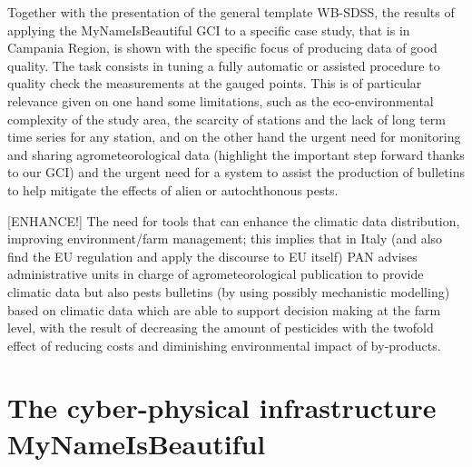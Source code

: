 \documentclass[authoryear,preprint,review,12pt]{elsarticle}
\begin{document}
Together with the presentation of the general template WB-SDSS, the results of applying the MyNameIsBeautiful GCI to a specific case study, that is in Campania Region, is shown with the specific focus of producing data of good quality.
The task consists in tuning a fully automatic or assisted procedure to quality check the measurements at the gauged points.
This is of particular relevance given on one hand some limitations, such as the eco-environmental complexity of the study area, the scarcity of stations and the lack of long term time series for any station, and on the other hand the urgent need for monitoring and sharing agrometeorological data (highlight the important step forward thanks to our GCI) and the urgent need for a system to assist the production of bulletins to help mitigate the effects of alien or autochthonous pests.

[ENHANCE!] The need for tools that can enhance the climatic data distribution, improving environment/farm management; this implies that in Italy (and also find the EU regulation and apply the discourse to EU itself) PAN advises administrative units in charge of agrometeorological publication to provide climatic data but also pests bulletins (by using possibly mechanistic modelling) based on climatic data which are able to support decision making at the farm level, with the result of decreasing the amount of pesticides with the twofold effect of reducing costs and diminishing environmental impact of by-products.

\section{The cyber-physical infrastructure MyNameIsBeautiful}
\end{document}

